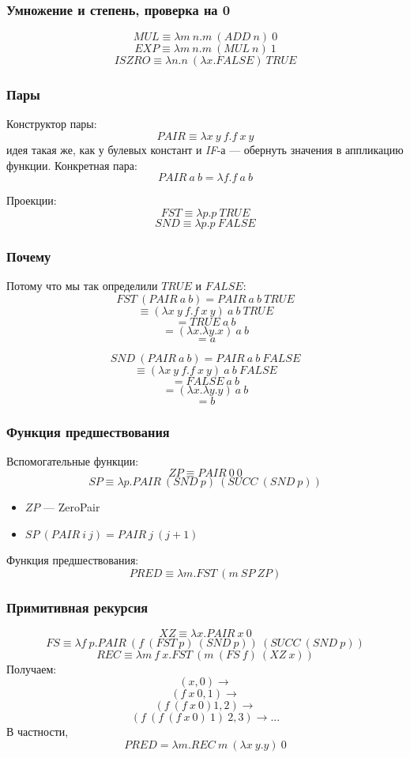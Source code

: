 \documentclass[xetex,mathserif,serif]{beamer}
\begin{document}
	\begin{frame}
		\frametitle{Умножение и степень, проверка на 0}
		$$MUL \equiv \lambda m\ n.m\ (ADD\ n)\ 0$$
		$$EXP \equiv \lambda m\ n.m\ (MUL\ n)\ 1$$
		$$ISZRO \equiv \lambda n.n\ (\lambda x.FALSE)\ TRUE$$
	\end{frame}

	\begin{frame}
		\frametitle{Пары}
		Конструктор пары:
		$$PAIR \equiv \lambda x\ y\ f.f\ x\ y$$
		идея такая же, как у булевых констант и \textit{IF}-а --- обернуть значения в аппликацию функции. Конкретная пара:
		$$PAIR\ a\ b = \lambda f.f\ a\ b$$
		
		Проекции:
		$$FST \equiv \lambda p.p\ TRUE$$
		$$SND \equiv \lambda p.p\ FALSE$$
	\end{frame}

	\begin{frame}
		\frametitle{Почему}
		Потому что мы так определили $TRUE$ и $FALSE$:
		$$FST\ (PAIR\ a\ b) = PAIR\ a\ b\ TRUE$$
		$$\equiv (\lambda x\ y\ f.f\ x\ y)\ a\ b\ TRUE$$
		$$= TRUE\ a\ b$$
		$$= (\lambda x.\lambda y.x)\ a\ b$$
		$$= a$$

		$$SND\ (PAIR\ a\ b) = PAIR\ a\ b\ FALSE$$
		$$\equiv (\lambda x\ y\ f.f\ x\ y)\ a\ b\ FALSE$$
		$$= FALSE\ a\ b$$
		$$= (\lambda x.\lambda y.y)\ a\ b$$
		$$= b$$
	\end{frame}

	\begin{frame}
		\frametitle{Функция предшествования}
		Вспомогательные функции:
		$$ZP \equiv PAIR\ 0\ 0$$
		$$SP \equiv \lambda p.PAIR\ (SND\ p)\ (SUCC\ (SND\ p))$$
		\begin{itemize}
			\item $ZP$ --- ZeroPair
			\item $SP\ (PAIR\ i\ j) = PAIR\ j\ (j + 1)$
		\end{itemize}

		\vspace{3mm}

		Функция предшествования:
		$$PRED \equiv \lambda m.FST\ (m\ SP\ ZP)$$
	\end{frame}

	\begin{frame}
		\frametitle{Примитивная рекурсия}
		$$XZ \equiv \lambda x.PAIR\ x\ 0$$
		$$FS \equiv \lambda f\ p.PAIR\ (f\ (FST\ p)\ (SND\ p))\ (SUCC\ (SND\ p))$$
		$$REC \equiv \lambda m\ f\ x.FST\ (m\ (FS\ f)\ (XZ\ x))$$
		Получаем:
		$$(x, 0) \rightarrow$$
		$$(f\ x\ 0, 1) \rightarrow$$
		$$(f\ (f\ x\ 0) 1, 2) \rightarrow$$
		$$(f\ (f\ (f\ x\ 0)\ 1)\ 2, 3) \rightarrow ...$$
		В частности, 
		$$PRED = \lambda m.REC\ m\ (\lambda x\ y.y)\ 0$$
	\end{frame}
\end{document}
